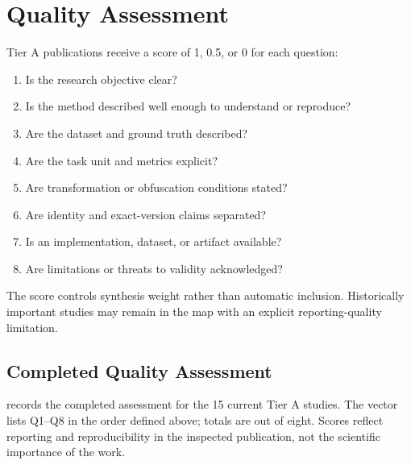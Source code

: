 \section{Quality Assessment}

Tier A publications receive a score of 1, 0.5, or 0 for each question:

\begin{enumerate}
  \item Is the research objective clear?
  \item Is the method described well enough to understand or reproduce?
  \item Are the dataset and ground truth described?
  \item Are the task unit and metrics explicit?
  \item Are transformation or obfuscation conditions stated?
  \item Are identity and exact-version claims separated?
  \item Is an implementation, dataset, or artifact available?
  \item Are limitations or threats to validity acknowledged?
\end{enumerate}

The score controls synthesis weight rather than automatic inclusion.
Historically important studies may remain in the map with an explicit
reporting-quality limitation.

\subsection{Completed Quality Assessment}

 records the completed assessment for the
15 current Tier A studies. The vector lists Q1--Q8 in the order defined above;
totals are out of eight. Scores reflect reporting and reproducibility in the
inspected publication, not the scientific importance of the work.

